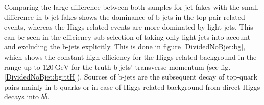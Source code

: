 %
Comparing the large difference between both samples for jet fakes with the small difference in b-jet fakes shows the dominance of b-jets in the top pair related events, whereas the Higgs related events are more dominated by light jets. This can be seen in the efficiency sub-selection of taking only light jets into account and excluding the b-jets explicitly. This is done in figure \ref{DividedNoBjet:bg}, which shows the constant high efficiency for the Higgs related background in the range up to $\SI{120}{\giga\electronvolt}$ for the truth b-jets' transverse momentum (see fig. \ref{DividedNoBjet:bg:ttH}). Sources of b-jets are the subsequent decay of top-quark pairs mainly in b-quarks or in case of Higgs related background from direct Higgs decays into $b\bar{b}$. \par%
%
